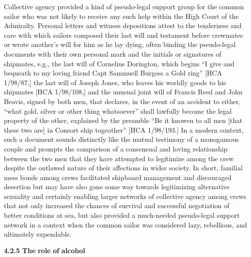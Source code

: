 Collective agency provided a kind of pseudo-legal support group for the common sailor who was not likely to receive any such help within the High Court of the Admiralty. Personal letters and witness depositions attest to the tenderness and care with which sailors composed their last will and testament before crewmates or wrote another’s will for him as he lay dying, often binding the pseudo-legal documents with their own personal mark and the initials or signatures of shipmates, e.g., the last will of Cornelius Dorington, which begins “I give and bequeath to my loving friend Capt Sammuell Burgess a Gold ring” [HCA 1/98/87,] the last will of Joseph Jones, who leaves his worldly goods to his shipmates [HCA 1/98/108,] and the unusual joint will of Francis Reed and John Beavis, signed by both men, that declares, in the event of an accident to either, “what gold, silver or other thing whatsoever” shall lawfully become the legal property of the other, explained by the preamble “Be it knowen to all men [that these two are] in Consort ship togeather” [HCA 1/98/193.] In a modern context, such a document sounds distinctly like the mutual testimony of a monogamous couple and prompts the comparison of a consensual and loving relationship between the two men that they have attempted to legitimize among the crew despite the outlawed nature of their affections in wider society. In short, familial mess bonds among crews facilitated shipboard management and discouraged desertion but may have also gone some way towards legitimizing alternative sexuality and certainly enabling larger networks of collective agency among crews that not only increased the chances of survival and successful negotiation of better conditions at sea, but also provided a much-needed pseudo-legal support network in a context when the common sailor was considered lazy, rebellious, and ultimately expendable. 

\textbf{4.2.5} \textbf{The} \textbf{role} \textbf{of} \textbf{alcohol} 

